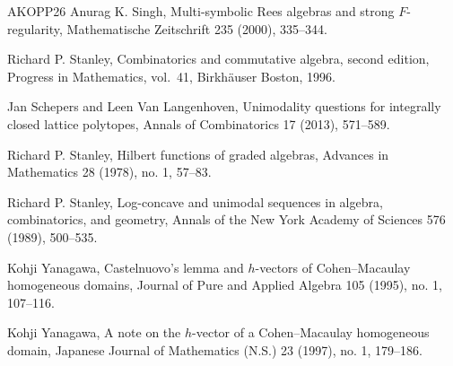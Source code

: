\documentclass[a4paper,11pt]{amsart}
\theoremstyle{definition}
\begin{document}
\begin{thebibliography}{AKOPP26}
 Anurag K. Singh, Multi-symbolic Rees algebras and strong $F$-regularity, Mathematische Zeitschrift 235 (2000), 335--344.

 Richard P. Stanley, Combinatorics and commutative algebra, second edition, Progress in Mathematics, vol.~41, Birkh\"auser Boston, 1996.

 Jan Schepers and Leen Van Langenhoven, Unimodality questions for integrally closed lattice polytopes, Annals of Combinatorics 17 (2013), 571--589.

 Richard P. Stanley, Hilbert functions of graded algebras, Advances in Mathematics 28 (1978), no. 1, 57--83.

 Richard P. Stanley, Log-concave and unimodal sequences in algebra, combinatorics, and geometry, Annals of the New York Academy of Sciences 576 (1989), 500--535.

 Kohji Yanagawa, Castelnuovo's lemma and $h$-vectors of Cohen--Macaulay homogeneous domains, Journal of Pure and Applied Algebra 105 (1995), no. 1, 107--116.

 Kohji Yanagawa, A note on the $h$-vector of a Cohen--Macaulay homogeneous domain, Japanese Journal of Mathematics (N.S.) 23 (1997), no. 1, 179--186.

\end{thebibliography}
\end{document}
